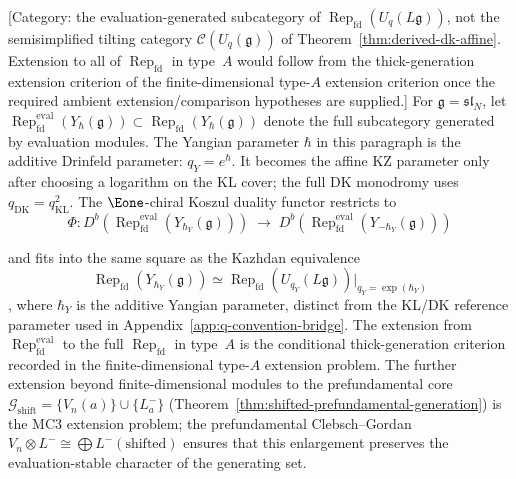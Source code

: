 \begin{theorem}\label{thm:derived-dk-yangian}
%
\textup{[Category: the evaluation-generated subcategory of
$\operatorname{Rep}_{\mathrm{fd}}(U_q(L\mathfrak{g}))$,
not the semisimplified tilting category
$\mathcal{C}(U_q(\mathfrak{g}))$ of
Theorem~\textup{\ref{thm:derived-dk-affine}}.
Extension to all of
$\operatorname{Rep}_{\mathrm{fd}}$ in type~$A$
would follow from the thick-generation extension criterion of
the finite-dimensional type-$A$ extension criterion once the
required ambient extension/comparison hypotheses are supplied.]}
%
For $\mathfrak{g} = \mathfrak{sl}_N$, let
$\operatorname{Rep}_{\mathrm{fd}}^{\mathrm{eval}}(Y_\hbar(\mathfrak{g}))
\subset \operatorname{Rep}_{\mathrm{fd}}(Y_\hbar(\mathfrak{g}))$
denote the full subcategory generated by evaluation modules.
The Yangian parameter $\hbar$ in this paragraph is the additive
Drinfeld parameter: $q_Y=e^\hbar$. It becomes the affine KZ parameter
only after choosing a logarithm on the KL cover; the full DK monodromy
uses $q_{\mathrm{DK}}=q_{\mathrm{KL}}^2$.
The $\Eone$-chiral Koszul duality functor restricts to
\[
\Phi \colon D^b(\operatorname{Rep}_{\mathrm{fd}}^{\mathrm{eval}}(Y_{\hbar_Y}(\mathfrak{g})))
\;\to\;
D^b(\operatorname{Rep}_{\mathrm{fd}}^{\mathrm{eval}}(Y_{-\hbar_Y}(\mathfrak{g})))
\]

and fits into the same square as the Kazhdan equivalence
\[
\operatorname{Rep}_{\mathrm{fd}}(Y_{\hbar_Y}(\mathfrak{g}))
\simeq
\operatorname{Rep}_{\mathrm{fd}}(U_{q_Y}(L\mathfrak{g}))
\big|_{q_Y = \exp(\hbar_Y)}
\]
\cite{Drinfeld85}, where \(\hbar_Y\) is the additive Yangian
parameter, distinct from the KL/DK reference parameter used in
Appendix~\ref{app:q-convention-bridge}.
The extension from $\operatorname{Rep}_{\mathrm{fd}}^{\mathrm{eval}}$
to the full $\operatorname{Rep}_{\mathrm{fd}}$ in type~$A$ is the
conditional thick-generation criterion recorded in the
finite-dimensional type-$A$ extension problem.
The further extension beyond finite-dimensional modules
to the prefundamental core
$\mathcal{G}_{\mathrm{shift}} =
\{V_n(a)\} \cup \{L^-_a\}$
(Theorem~\ref{thm:shifted-prefundamental-generation})
is the MC3 extension problem; the prefundamental Clebsch--Gordan
$V_n \otimes L^- \cong \bigoplus L^-(\text{shifted})$
ensures that this enlargement preserves the evaluation-stable
character of the generating set.


\end{theorem}
